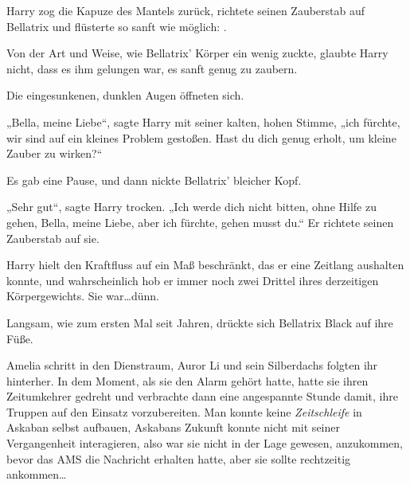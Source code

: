 Harry zog die Kapuze des Mantels zurück, richtete seinen Zauberstab auf Bellatrix und flüsterte so sanft wie möglich: .

Von der Art und Weise, wie Bellatrix' Körper ein wenig zuckte, glaubte Harry nicht, dass es ihm gelungen war, es sanft genug zu zaubern.

Die eingesunkenen, dunklen Augen öffneten sich.

„Bella, meine Liebe“, sagte Harry mit seiner kalten, hohen Stimme, „ich fürchte, wir sind auf ein kleines Problem gestoßen. Hast du dich genug erholt, um kleine Zauber zu wirken?“

Es gab eine Pause, und dann nickte Bellatrix' bleicher Kopf.

„Sehr gut“, sagte Harry trocken. „Ich werde dich nicht bitten, ohne Hilfe zu gehen, Bella, meine Liebe, aber ich fürchte, gehen musst du.“ Er richtete seinen Zauberstab auf sie. 

Harry hielt den Kraftfluss auf ein Maß beschränkt, das er eine Zeitlang aushalten konnte, und wahrscheinlich hob er immer noch zwei Drittel ihres derzeitigen Körpergewichts. Sie war…dünn.

Langsam, wie zum ersten Mal seit Jahren, drückte sich Bellatrix Black auf ihre Füße.

\later

Amelia schritt in den Dienstraum, Auror Li und sein Silberdachs folgten ihr hinterher. In dem Moment, als sie den Alarm gehört hatte, hatte sie ihren Zeitumkehrer gedreht und verbrachte dann eine angespannte Stunde damit, ihre Truppen auf den Einsatz vorzubereiten. Man konnte keine \emph{Zeitschleife} in Askaban selbst aufbauen, Askabans Zukunft konnte nicht mit seiner Vergangenheit interagieren, also war sie nicht in der Lage gewesen, anzukommen, bevor das AMS die Nachricht erhalten hatte, aber sie sollte rechtzeitig ankommen…

